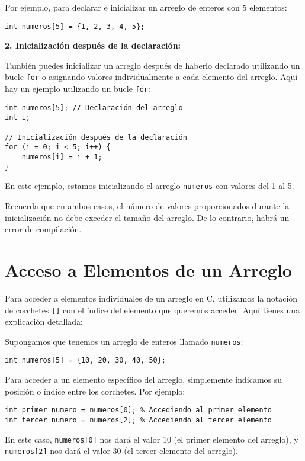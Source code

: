 \documentclass{article}
\begin{document}
Por ejemplo, para declarar e inicializar un arreglo de enteros con 5 elementos:

\begin{verbatim}
int numeros[5] = {1, 2, 3, 4, 5};
\end{verbatim}

\textbf{2. Inicialización después de la declaración:}

También puedes inicializar un arreglo después de haberlo declarado utilizando un bucle \texttt{for} o asignando valores individualmente a cada elemento del arreglo. Aquí hay un ejemplo utilizando un bucle \texttt{for}:

\begin{verbatim}
int numeros[5]; // Declaración del arreglo
int i;

// Inicialización después de la declaración
for (i = 0; i < 5; i++) {
    numeros[i] = i + 1;
}
\end{verbatim}

En este ejemplo, estamos inicializando el arreglo \texttt{numeros} con valores del 1 al 5.

Recuerda que en ambos casos, el número de valores proporcionados durante la inicialización no debe exceder el tamaño del arreglo. De lo contrario, habrá un error de compilación.


\section{Acceso a Elementos de un Arreglo}

Para acceder a elementos individuales de un arreglo en C, utilizamos la notación de corchetes \texttt{[]} con el índice del elemento que queremos acceder. Aquí tienes una explicación detallada:

Supongamos que tenemos un arreglo de enteros llamado \texttt{numeros}:

\begin{verbatim}
int numeros[5] = {10, 20, 30, 40, 50};
\end{verbatim}

Para acceder a un elemento específico del arreglo, simplemente indicamos su posición o índice entre los corchetes. Por ejemplo:

\begin{verbatim}
int primer_numero = numeros[0]; % Accediendo al primer elemento
int tercer_numero = numeros[2]; % Accediendo al tercer elemento
\end{verbatim}

En este caso, \texttt{numeros[0]} nos dará el valor 10 (el primer elemento del arreglo), y \texttt{numeros[2]} nos dará el valor 30 (el tercer elemento del arreglo).
\end{document}
